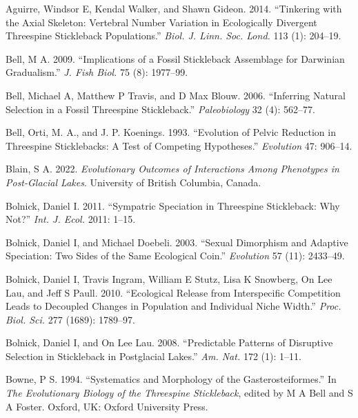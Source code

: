 \documentclass[
  12pt,
]{article}
\newlength{\cslhangindent}
\newlength{\cslentryspacingunit} %
\newenvironment{CSLReferences}[2] %
 {%
  \setlength{\parindent}{0pt}
  \ifodd #1
  \let\oldpar\par
  \def\par{\hangindent=\cslhangindent\oldpar}
  \fi
  \setlength{\parskip}{#2\cslentryspacingunit}
 }%
 {}
\begin{document}
\hypertarget{refs}{}
\begin{CSLReferences}{1}{0}
\leavevmode{}%
Aguirre, Windsor E, Kendal Walker, and Shawn Gideon. 2014. {``Tinkering
with the Axial Skeleton: Vertebral Number Variation in Ecologically
Divergent Threespine Stickleback Populations.''} \emph{Biol. J. Linn.
Soc. Lond.} 113 (1): 204--19.

\leavevmode{}%
Bell, M A. 2009. {``Implications of a Fossil Stickleback Assemblage for
Darwinian Gradualism.''} \emph{J. Fish Biol.} 75 (8): 1977--99.

\leavevmode{}%
Bell, Michael A, Matthew P Travis, and D Max Blouw. 2006. {``Inferring
Natural Selection in a Fossil Threespine Stickleback.''}
\emph{Paleobiology} 32 (4): 562--77.

\leavevmode{}%
Bell, Orti, M. A., and J. P. Koenings. 1993. {``Evolution of Pelvic
Reduction in Threespine Sticklebacks: A Test of Competing Hypotheses.''}
\emph{Evolution} 47: 906--14.

\leavevmode{}%
Blain, S A. 2022. \emph{Evolutionary Outcomes of Interactions Among
Phenotypes in Post-Glacial Lakes}. University of British Columbia,
Canada.

\leavevmode{}%
Bolnick, Daniel I. 2011. {``Sympatric Speciation in Threespine
Stickleback: Why Not?''} \emph{Int. J. Ecol.} 2011: 1--15.

\leavevmode{}%
Bolnick, Daniel I, and Michael Doebeli. 2003. {``Sexual Dimorphism and
Adaptive Speciation: Two Sides of the Same Ecological Coin.''}
\emph{Evolution} 57 (11): 2433--49.

\leavevmode{}%
Bolnick, Daniel I, Travis Ingram, William E Stutz, Lisa K Snowberg, On
Lee Lau, and Jeff S Paull. 2010. {``Ecological Release from
Interspecific Competition Leads to Decoupled Changes in Population and
Individual Niche Width.''} \emph{Proc. Biol. Sci.} 277 (1689): 1789--97.

\leavevmode{}%
Bolnick, Daniel I, and On Lee Lau. 2008. {``Predictable Patterns of
Disruptive Selection in Stickleback in Postglacial Lakes.''} \emph{Am.
Nat.} 172 (1): 1--11.

\leavevmode{}%
Bowne, P S. 1994. {``Systematics and Morphology of the
Gasterosteiformes.''} In \emph{The Evolutionary Biology of the
Threespine Stickleback}, edited by M A Bell and S A Foster. Oxford, UK:
Oxford University Press.


\end{CSLReferences}
\end{document}
